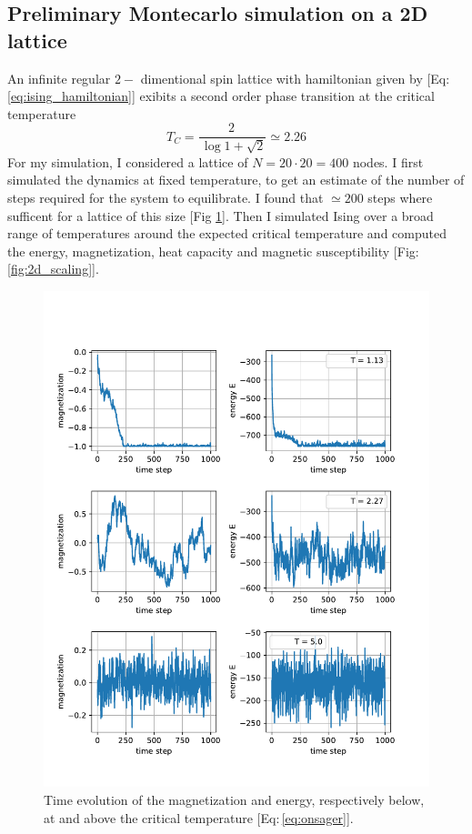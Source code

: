 {\subsection*{Preliminary Montecarlo simulation on a 2D lattice}
{\small
An infinite regular $2-$ dimentional spin lattice with hamiltonian given by [Eq: \ref{eq:ising_hamiltonian}] exibits a second order phase transition at the critical temperature 
\begin{equation}
T_C = \frac{2\,}{\,\log{1 + \sqrt{2}}} \simeq 2.26
    \label{eq:onsager}
  \end{equation}  
For my simulation, I considered a lattice of $N = 20 \cdot 20 = 400$ nodes. I first simulated the dynamics at fixed temperature, to get an estimate of the number of steps required for the system to equilibrate. I found that $\simeq 200$ steps where sufficent for a lattice of this size [Fig \ref{fig:2d_relaxation}]. Then I simulated Ising over a broad range of temperatures around the expected critical temperature and computed the energy, magnetization, heat capacity and magnetic susceptibility [Fig: \ref{fig:2d_scaling}].
}
\begin{figure}[H]
    \centering
    \includegraphics[width=0.8\linewidth]{latex_source/images/ising/2d_relaxation.pdf}
    \caption{{\small Time evolution of the magnetization and energy, respectively below, at and above the critical temperature [Eq:\,\ref{eq:onsager}].}}
    \label{fig:2d_relaxation}
\end{figure}

}
